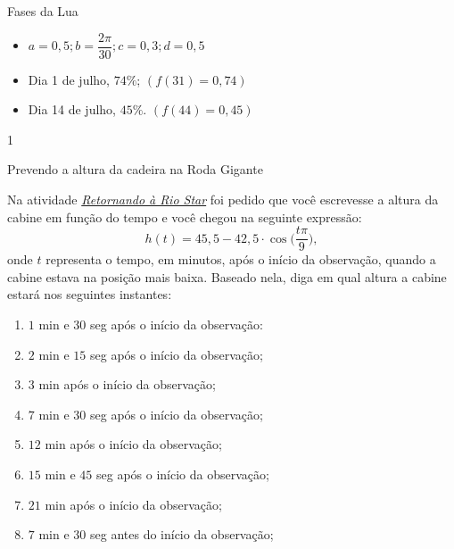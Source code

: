 \begin{answer}{Fases da Lua}
{
\begin{itemize}
\item $a=0{,}5; b=\dfrac{2\pi}{30};c=0{,}3; d=0{,}5$
\item Dia 1 de julho, $74\%$; $(f(31)=0{,}74)$
\item Dia 14 de julho, $45\%$. $(f(44)=0{,}45)$
\end{itemize}
}{1}
\end{answer}

\begin{task}{Prevendo a altura da cadeira na Roda Gigante}

Na atividade \hyperref[trig-ativ15]{\textit{Retornando à Rio Star}} foi pedido que você escrevesse a altura da cabine em função do tempo e você chegou na seguinte expressão:
\begin{equation*}
h(t)=45{,}5-42{,}5\cdot\cos\bigg(\frac{t\pi}{9}\bigg),
\end{equation*}
onde $t$ representa o tempo, em minutos, após o início da observação, quando a cabine estava na posição mais baixa. Baseado nela, diga em qual altura a cabine estará nos seguintes instantes:

\begin{enumerate}
\item $1$ min e $30$ seg após o início da observação:
\item $2$ min e $15$ seg após o início da observação;
\item $3$ min após o início da observação;
\item $7$ min e $30$ seg após o início da observação;
\item $12$ min após o início da observação;
\item $15$ min e $45$ seg após o início da observação;
\item $21$ min após o início da observação;
\item $7$ min e $30$ seg antes do início da observação;
\end{enumerate}
\end{task}


